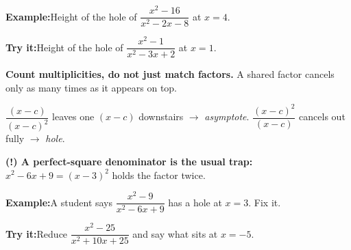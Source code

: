\documentclass[12pt]{article}
\begin{document}
\begin{examplebox}
\textbf{Example:}\quad Height of the hole of $\dfrac{x^2-16}{x^2-2x-8}$ at $x = 4$.
\end{examplebox}

\begin{tryitbox}
\textbf{Try it:}\quad Height of the hole of $\dfrac{x^2-1}{x^2-3x+2}$ at $x = 1$.\\[2pt]
\end{tryitbox}


\begin{formulabox}
\textbf{Count multiplicities, do not just match factors.} A shared factor cancels only
as many times as it appears on top.\par
$\dfrac{(x-c)}{(x-c)^2}$ leaves one $(x-c)$ downstairs $\rightarrow$ \emph{asymptote}.\quad
$\dfrac{(x-c)^2}{(x-c)}$ cancels out fully $\rightarrow$ \emph{hole}.\par
\textbf{(!) A perfect-square denominator is the usual trap:} $x^2 - 6x + 9 = (x-3)^2$ holds the factor twice.
\end{formulabox}

\begin{examplebox}
\textbf{Example:}\quad A student says $\dfrac{x^2-9}{x^2-6x+9}$ has a hole at $x = 3$. Fix it.
\end{examplebox}

\begin{tryitbox}
\textbf{Try it:}\quad Reduce $\dfrac{x^2-25}{x^2+10x+25}$ and say what sits at $x = -5$.\\[2pt]
\end{tryitbox}
\end{document}
